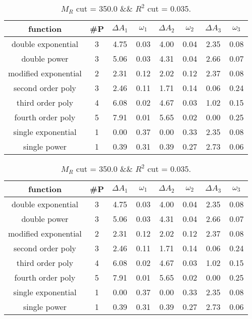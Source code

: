  
\begin{table}[H] 
\begin{center} 
\begin{tabular}{|c|c|cc|cc|cc|} 
\hline function & \#P & $\Delta A_1$ & $\omega_1$ & $\Delta A_2$ & $\omega_2$ & $\Delta A_3$ & $\omega_3$ \\ \hline 
double exponential &  3 &   4.75 &   0.03 &   4.00 &   0.04 &   2.35 &   0.08 \\ 
double power &  3 &   5.06 &   0.03 &   4.31 &   0.04 &   2.66 &   0.07 \\ 
modified exponential &  2 &   2.31 &   0.12 &   2.02 &   0.12 &   2.37 &   0.08 \\ 
second order poly &  3 &   2.46 &   0.11 &   1.71 &   0.14 &   0.06 &   0.24 \\ 
third order poly &  4 &   6.08 &   0.02 &   4.67 &   0.03 &   1.02 &   0.15 \\ 
fourth order poly &  5 &   7.91 &   0.01 &   5.65 &   0.02 &   0.00 &   0.25 \\ 
single exponential &  1 &   0.00 &   0.37 &   0.00 &   0.33 &   2.35 &   0.08 \\ 
single power &  1 &   0.39 &   0.31 &   0.39 &   0.27 &   2.73 &   0.06 \\ 
\hline 
\end{tabular} 
\caption{$M_R$ cut = 350.0 \&\& $R^2$ cut = 0.035.} 
\label{tab:FitChoices_350.0_0.035} 
\end{center} 
\end{table} 
 
 
\begin{table}[H] 
\begin{center} 
\begin{tabular}{|c|c|cc|cc|cc|} 
\hline function & \#P & $\Delta A_1$ & $\omega_1$ & $\Delta A_2$ & $\omega_2$ & $\Delta A_3$ & $\omega_3$ \\ \hline 
double exponential &  3 &   4.75 &   0.03 &   4.00 &   0.04 &   2.35 &   0.08 \\ 
double power &  3 &   5.06 &   0.03 &   4.31 &   0.04 &   2.66 &   0.07 \\ 
modified exponential &  2 &   2.31 &   0.12 &   2.02 &   0.12 &   2.37 &   0.08 \\ 
second order poly &  3 &   2.46 &   0.11 &   1.71 &   0.14 &   0.06 &   0.24 \\ 
third order poly &  4 &   6.08 &   0.02 &   4.67 &   0.03 &   1.02 &   0.15 \\ 
fourth order poly &  5 &   7.91 &   0.01 &   5.65 &   0.02 &   0.00 &   0.25 \\ 
single exponential &  1 &   0.00 &   0.37 &   0.00 &   0.33 &   2.35 &   0.08 \\ 
single power &  1 &   0.39 &   0.31 &   0.39 &   0.27 &   2.73 &   0.06 \\ 
\hline 
\end{tabular} 
\caption{$M_R$ cut = 350.0 \&\& $R^2$ cut = 0.035.} 
\label{tab:FitChoices_350.0_0.035} 
\end{center} 
\end{table} 
 
